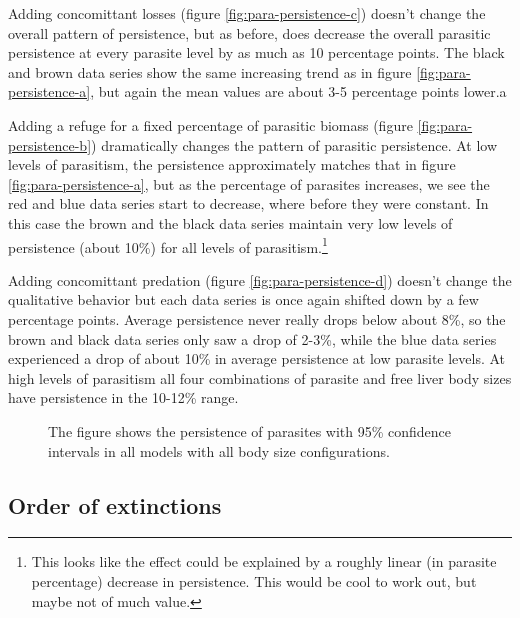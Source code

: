 \documentclass[11pt]{amsart}
\begin{document}
Adding concomittant losses (figure \ref{fig:para-persistence-c}) doesn't change the overall pattern of persistence, but as before, does decrease the overall parasitic persistence at every parasite level by as much as 10 percentage points.  The black and brown data series show the same increasing trend as in figure \ref{fig:para-persistence-a}, but again the mean values are about 3-5 percentage points lower.a

Adding a refuge for a fixed percentage of parasitic biomass (figure \ref{fig:para-persistence-b}) dramatically changes the pattern of parasitic persistence.  At low levels of parasitism, the persistence approximately matches that in figure \ref{fig:para-persistence-a}, but as the percentage of parasites increases, we see the red and blue data series start to decrease, where before they were constant.  In this case the brown and the black data series maintain very low levels of persistence (about 10\%) for all levels of parasitism.\footnote{This looks like the effect could be explained by a roughly linear (in parasite percentage) decrease in persistence.  This would be cool to work out, but maybe not of much value.}

  Adding concomittant predation (figure \ref{fig:para-persistence-d}) doesn't change the qualitative behavior but each data series is once again shifted down by a few percentage points.  Average persistence never really drops below about 8\%, so the brown and black data series only saw a drop of 2-3\%, while the blue data series experienced a drop of about 10\% in average persistence at low parasite levels.  At high levels of parasitism all four combinations of parasite and free liver body sizes have persistence in the 10-12\% range.

\begin{figure}[h]
\caption{The figure shows the persistence of parasites with 95\% confidence intervals in all models with all body size configurations.}
\label{fig:persistencePara}
\end{figure}


\subsection{Order of extinctions\label{sec:extinctionOrders}}
\end{document}
